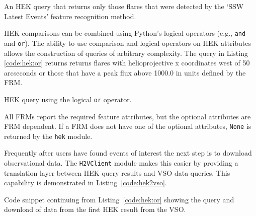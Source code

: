 \begin{listing}[H]
\caption{An HEK query that returns only those flares that were
  detected by the `SSW Latest Events' feature recognition method.}
\label{code:hek:frm}
\end{listing}

HEK comparisons can be combined using Python's logical operators (e.g., \texttt{and}
and \texttt{or}). The ability to use comparison and logical operators on HEK attributes allows 
the construction of queries of arbitrary complexity.
The query in Listing \ref{code:hek:or} returns
returns flares with helioprojective x coordinates west of 50 arcseconds or 
those that have a peak flux above 1000.0 in units defined by the FRM.

\begin{listing}[H]
\caption{HEK query using the logical \texttt{or} operator.}
\label{code:hek:or}
\end{listing}
All FRMs report the required feature attributes, but the optional attributes 
are FRM dependent.  If a FRM does not have one of the optional attributes, 
\texttt{None} is returned by the \texttt{hek} module. 
 
Frequently after users have found events of interest the next step is to 
download observational data. The \texttt{H2VClient} module makes this
easier by providing a translation layer between HEK query results
and VSO data queries. This capability is demonstrated in Listing~\ref{code:hek2vso}.
\begin{listing}[H]
\caption{Code snippet continuing from Listing~\ref{code:hek:or} showing the 
query and download of data from the first HEK result from the VSO.}
\label{code:hek2vso}
\end{listing}
